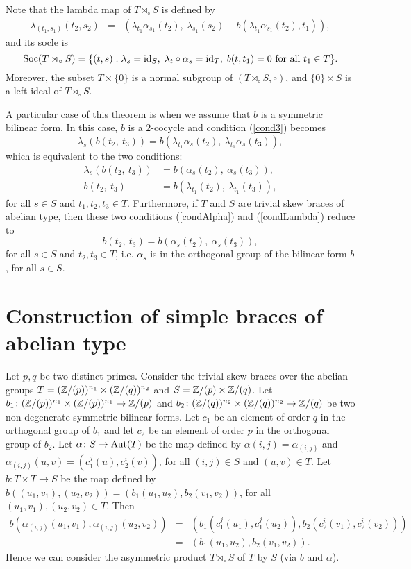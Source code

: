 Note that the lambda map of $T\rtimes_\circ S$ is defined by
\begin{eqnarray} \label{deflambda}
	\lambda_{(t_1,s_1)}(t_2,s_2)&=&
	\left(
	\lambda_{t_1}\alpha_{s_1}(t_2),~
	\lambda_{s_1}(s_2)-b(\lambda_{t_1}\alpha_{s_1}(t_2),t_1)
	\right),
\end{eqnarray}
and its socle is
$$
\operatorname{Soc}(T\rtimes_\circ S)=\{(t,s) : \lambda_s=\operatorname{id}_S,\;\lambda_t\circ
\alpha_s=\operatorname{id}_T,\; b(t,t_1)=0\mbox{ for all }t_1\in T\}.
$$
Moreover, the subset $T\times\{0\}$ is a normal subgroup of $(T\rtimes_\circ S,\circ)$, and $\{0\}\times S$ is a left
ideal of $T\rtimes_\circ S$.

A particular case of this theorem is when we assume that $b$ is a symmetric bilinear form. In this case, $b$ is a $2$-cocycle and
condition (\ref{cond3}) becomes
$$
\lambda_s(b(t_2,~t_3))=b(\lambda_{t_1}\alpha_{s}(t_2),~\lambda_{t_1}\alpha_{s}(t_3)),
$$
which is equivalent to the two conditions:
\begin{align}
	\lambda_s(b(t_2,~t_3))&=b(\alpha_{s}(t_2),~\alpha_{s}(t_3)),\label{condAlpha} \\
	b(t_2,~t_3)&=b(\lambda_{t_1}(t_2),~\lambda_{t_1}(t_3)),\label{condLambda}
\end{align}
for all $s\in S$ and $t_1,t_2,t_3\in T$.
Furthermore, if $T$ and $S$ are trivial skew braces of abelian type, then these two conditions (\ref{condAlpha}) and (\ref{condLambda}) reduce to 
$$b(t_2,~t_3)=b(\alpha_{s}(t_2),~\alpha_{s}(t_3)),$$
for all $s\in S$ and $t_2,t_3\in T$, i.e. $\alpha_s$ is in the orthogonal group of the bilinear form $b$, for all $s\in S$.
   
\section{Construction of simple braces of abelian type}

Let $p,q$ be two distinct primes. Consider the trivial skew braces over the abelian groups $T=(\mathbb{Z}/(p))^{n_1}\times (\mathbb{Z}/(q))^{n_2}$ and $S=\mathbb{Z}/(p)\times \mathbb{Z}/(q)$. Let $b_1\colon (\mathbb{Z}/(p))^{n_1}\times (\mathbb{Z}/(p))^{n_1}\rightarrow \mathbb{Z}/(p)$ and $b_2\colon (\mathbb{Z}/(q))^{n_2}\times (\mathbb{Z}/(q))^{n_2}\rightarrow \mathbb{Z}/(q)$ be two non-degenerate symmetric bilinear forms. Let $c_1$ be an element of order $q$ in the orthogonal group of $b_1$ and let $c_2$ be an element of order $p$ in the orthogonal group of $b_2$. Let $\alpha\colon S\rightarrow \operatorname{Aut}(T)$ be the map defined by $\alpha(i,j)=\alpha_{(i,j)}$ and $\alpha_{(i,j)}(u,v)=(c_1^{j}(u),c_2^{i}(v))$, for all $(i,j)\in S$ and $(u,v)\in T$. Let $b\colon T\times T\rightarrow S$ be the map defined by $b((u_1,v_1),(u_2,v_2))=(b_1(u_1,u_2),b_2(v_1,v_2))$, for all $(u_1,v_1),(u_2,v_2)\in T$. Then
\begin{eqnarray*}b(\alpha_{(i,j)}(u_1,v_1),\alpha_{(i,j)}(u_2,v_2))&=&(b_1(c_1^{j}(u_1),c_1^{j}(u_2)),b_2(c_2^{i}(v_1),c_2^{i}(v_2)))\\
	&=&(b_1(u_1,u_2),b_2(v_1,v_2)).
\end{eqnarray*}
Hence we can consider the asymmetric product $T\rtimes_{\circ}S$ of $T$ by $S$ (via $b$ and $\alpha$). 

